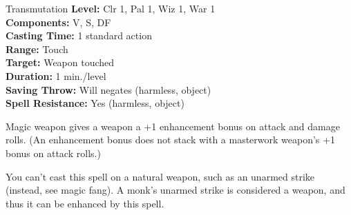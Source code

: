 {Transmutation}
{
	\textbf{Level:}
	Clr 1, Pal 1, Wiz 1, War 1\\
	\textbf{Components:}
	V, S, DF\\
	\textbf{Casting Time:}
	1 standard action\\
	\textbf{Range:}
	Touch\\
	\textbf{Target:}
	Weapon touched\\
	\textbf{Duration:}
	1 min./level\\
	\textbf{Saving Throw:}
	Will negates (harmless, object)\\
	\textbf{Spell Resistance:}
	Yes (harmless, object)\\
}
{
	Magic weapon gives a weapon a +1 enhancement bonus on attack and damage rolls. (An enhancement bonus does not stack with a masterwork weapon's +1 bonus on attack rolls.)

	You can't cast this spell on a natural weapon, such as an unarmed strike (instead, see magic fang). A monk's unarmed strike is considered a weapon, and thus it can be enhanced by this spell.

}
